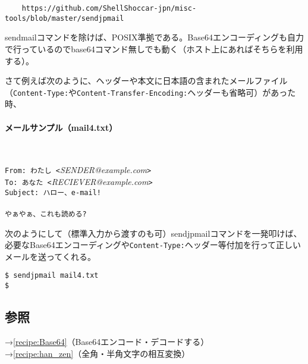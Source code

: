 \begin{verbatim}
	https://github.com/ShellShoccar-jpn/misc-tools/blob/master/sendjpmail
\end{verbatim}

sendmailコマンドを除けば、POSIX準拠である。Base64エンコーディングも自力で行っているのでbase64コマンド無しでも動く（ホスト上にあればそちらを利用する）。

さて例えば次のように、ヘッダーや本文に日本語の含まれたメールファイル（\verb|Content-Type:|や\verb|Content-Transfer-Encoding:|ヘッダーも省略可）があった時、

\paragraph{メールサンプル（mail4.txt）}　\\
\begin{frameboxit}{160.0mm}
	\verb|From: わたし <|\textit{SENDER@example.com}\verb|>| \\
	\verb|To: あなた <|\textit{RECIEVER@example.com}\verb|>| \\
	\verb|Subject: ハロー、e-mail!| \\
	\verb|| \\
	\verb|やぁやぁ、これも読める?|
\end{frameboxit}

次のようにして（標準入力から渡すのも可）sendjpmailコマンドを一発叩けば、必要なBase64エンコーディングや\verb|Content-Type:|ヘッダー等付加を行って正しいメールを送ってくれる。
\begin{screen}
	\verb!$ sendjpmail mail4.txt! \return \\
	\verb!$ !
\end{screen}


\subsection*{参照}

\noindent
→\ref{recipe:Base64}（Base64エンコード・デコードする）\\
→\ref{recipe:han_zen}（全角・半角文字の相互変換）
